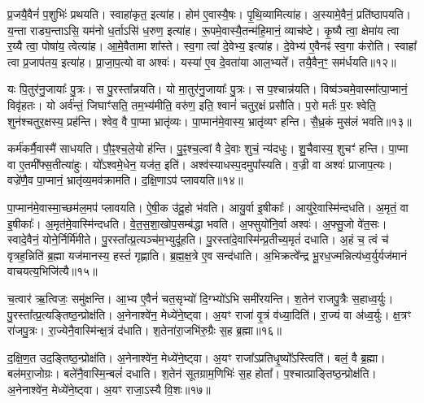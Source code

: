 प्र॒जयै॒वैनं॑ प॒शुभिः॑ प्रथयति।
स्वाहा॑कृत॒ इत्या॑ह।
होम॑ ए॒वास्यै॒षः।
पृ॒थि॒व्यामित्या॑ह।
अ॒स्यामे॒वैनं॒ प्रति॑\-ष्ठापयति।
य॒न्ता राड्य॒न्ताऽसि॒ यम॑नो ध॒र्ताऽसि॑ ध॒रुण॒ इत्या॑ह।
रू॒पमे॒वास्यै॒तन्म॑हि॒मानं॒ व्याच॑ष्टे।
कृ॒ष्यै त्वा॒ क्षेमा॑य त्वा र॒य्यै त्वा॒ पोषा॑य॒ त्वेत्या॑ह।
आ॒\-मे॒वैतामा शा᳚स्ते।
स्व॒गा त्वा॑ दे॒वेभ्य॒ इत्या॑ह।
दे॒वेभ्य॑ ए॒वैनꣴ॑ स्व॒गा क॑रोति।
स्वाहा᳚ त्वा प्र॒जा\-प॑तय॒ इत्या॑ह।
प्रा॒जा॒प॒त्यो वा अश्वः॑।
यस्या॑ ए॒व दे॒वता॑या आल॒भ्यते᳚।
तयै॒वैन॒ꣳ॒ सम॑र्धयति॥१२॥\anuvakamend[ब॒ध्ना॒ति॒ समृ॑द्ध्या उ॒पाद॑धात्य॒सीत्या॑ह॒ सप्र॑थस॒मित्या॑ह दे॒वेभ्य॒ इत्या॑ह॒ पञ्च॑ च]

यः पि॒तुर॑नु॒जायाः᳚ पु॒त्रः।
स पु॒रस्ता᳚न्नयति।
यो मा॒तुर॑नु॒जायाः᳚ पु॒त्रः।
स प॒श्चान्न॑यति।
विष्व॑ञ्चमे॒वास्मा᳚त्पा॒प्मानं॒ विवृ॑हतः।
यो अर्व॑न्तं॒ जिघाꣳ॑सति॒ तम॒भ्य॑मीति॒ वरु॑ण॒ इति॒ श्वानं॑ चतुर॒क्षं प्रसौ॑ति।
प॒रो मर्तः॑ प॒रः श्वेति॒ शुन॑श्चतुर॒क्षस्य॒ प्रह॑न्ति।
श्वेव॒ वै पा॒प्मा भ्रातृ॑व्यः।
पा॒प्मान॑मे॒वास्य॒ भ्रातृ॑व्यꣳ हन्ति।
सै॒ध्र॒कं मुस॑लं भवति॥१३॥

कर्म॑कर्मै॒वास्मै॑ साधयति।
पौ॒ꣴ॒श्च॒ले॒यो ह॑न्ति।
पु॒ꣴ॒श्च॒ल्वां वै दे॒वाः शुचं॒ न्य॑दधुः।
शु॒चैवास्य॒ शुचꣳ॑ हन्ति।
पा॒प्मा वा ए॒तमी᳚फ्स॒तीत्या॑हुः।
यो᳚ऽश्वमे॒धेन॒ यज॑त॒ इति॑।
अश्व॑स्याधस्प॒दमु\-पा᳚स्यति।
व॒ज्री वा अश्वः॑ प्राजाप॒त्यः।
वज्रे॑णै॒व पा॒प्मानं॒ भ्रातृ॑व्य॒मव॑\-क्रामति।
द॒क्षि॒णाऽप॑ प्लावयति॥१४॥

पा॒प्मान॑मे॒वास्मा॒च्छम॑ल॒मप॑ प्लावयति।
ऐ॒षी॒क उ॑दू॒हो भ॑वति।
आयु॒र्वा इ॒षीकाः᳚।
आयु॑रे॒वास्मि॑न्दधति।
अ॒मृतं॒ वा इ॒षीकाः᳚।
अ॒मृत॑मे॒वास्मि॑न्दधति।
वे॒त॒स॒शा॒खोप॒सम्ब॑द्धा भवति।
अ॒फ्सुयो॑नि॒र्वा अश्वः॑।
अ॒फ्सु॒जो वे॑त॒सः।
स्वादे॒वैनं॒ योने॒र्निर्मि॑मीते।
पु॒रस्ता᳚त्प्र॒त्यञ्च॑म॒भ्युदू॑हति।
पु॒रस्ता॑दे॒वास्मि॑न्प्र॒तीच्य॒मृतं॑ दधाति।
अ॒हं च॒ त्वं च॑ वृत्रह॒न्निति॑ ब्र॒ह्मा यज॑मानस्य॒ हस्तं॑ गृह्णाति।
ब्र॒ह्म॒क्ष॒त्रे ए॒व सन्द॑धाति।
अ॒भिक्रत्वे᳚न्द्र भू॒रध॒ज्मन्नित्य॑ध्व॒र्युर्यज॑मानं वाचयत्य॒भिजि॑त्यै॥१५॥\anuvakamend[भ॒व॒ति॒ प्ला॒व॒य॒ति॒ मि॒मी॒ते॒ पञ्च॑ च]

च॒त्वार॑ ऋ॒त्विजः॒ समु॑क्षन्ति।
आ॒भ्य ए॒वैनं॑ चत॒सृभ्यो॑ दि॒ग्भ्यो॑\-ऽभि समी॑रयन्ति।
श॒तेन॑ राजपु॒त्रैः स॒हाध्व॒र्युः।
पु॒रस्ता᳚त्\-प्र॒त्यङ्तिष्ठ॒न्प्रोक्ष॑ति।
अ॒नेनाश्वे॑न॒ मेध्ये॑ने॒ष्ट्वा।
अ॒यꣳ राजा॑ वृ॒त्रं व॑ध्या॒दिति॑।
रा॒ज्यं वा अ॑ध्व॒र्युः।
क्ष॒त्रꣳ रा॑जपु॒त्रः।
रा॒ज्ये\-नै॒वास्मि॑न्क्ष॒त्रं द॑धाति।
श॒तेना॑रा॒जभि॑रु॒ग्रैः स॒ह ब्र॒ह्मा॥१६॥

द॒क्षि॒ण॒त उद॒ङ्तिष्ठ॒न्प्रोक्ष॑ति।
अ॒नेनाश्वे॑न॒ मेध्ये॑ने॒ष्ट्वा।
अ॒यꣳ राजा᳚\-ऽप्रतिधृ॒ष्यो᳚\-ऽस्त्विति॑।
बलं॒ वै ब्र॒ह्मा।
बल॑मरा॒जोग्रः।
बले॑\-नै॒वा\-स्मि॒न्बलं॑ दधाति।
श॒तेन॑ सूतग्राम॒णिभिः॑ स॒ह होता᳚।
प॒श्चात्प्राङ्तिष्ठ॒न्प्रोक्ष॑ति।
अ॒नेनाश्वे॑न॒ मेध्ये॑ने॒ष्ट्वा।
अ॒यꣳ राजा॒\-ऽस्यै वि॒शः॥१७॥

